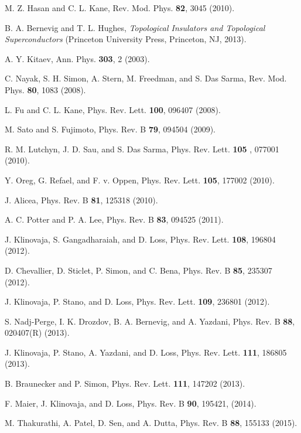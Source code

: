 \documentclass[prl,twocolumn,showpacs,floatfix,amsbsy,amsbsy,superscriptaddress]{revtex4-1}
\begin{document}
\begin{thebibliography}{99}

 M. Z. Hasan and C. L. Kane, Rev. Mod. Phys. {\bf 82}, 3045 (2010).

 B. A. Bernevig and T. L. Hughes, {\it Topological Insulators and Topological Superconductors} (Princeton University Press, Princeton, NJ, 2013).

 A. Y. Kitaev, Ann. Phys. {\bf 303}, 2 (2003).

  C. Nayak, S. H. Simon, A. Stern, M. Freedman, and S. Das Sarma, Rev. Mod. Phys. {\bf 80}, 1083  (2008).

 L. Fu and C. L. Kane, Phys. Rev. Lett. {\bf 100}, 096407 (2008).

 M. Sato and S. Fujimoto, Phys. Rev. B {\bf 79}, 094504 (2009).

 R. M. Lutchyn, J. D. Sau, and S. Das Sarma, Phys. Rev. Lett. {\bf 105} , 077001 (2010).

 Y. Oreg, G. Refael, and F. v. Oppen, Phys. Rev. Lett. {\bf 105}, 177002 (2010).

 J. Alicea, Phys. Rev. B {\bf 81}, 125318 (2010).

 A. C. Potter and P. A. Lee, Phys. Rev. B {\bf 83}, 094525 (2011).

 J. Klinovaja, S. Gangadharaiah, and D. Loss, Phys. Rev. Lett. {\bf 108}, 196804 (2012).

 D. Chevallier, D. Sticlet, P. Simon, and C. Bena, Phys. Rev. B {\bf 85}, 235307 (2012).

 J. Klinovaja, P. Stano, and D. Loss, Phys. Rev. Lett. {\bf 109}, 236801 (2012).

 S. Nadj-Perge, I. K. Drozdov, B. A. Bernevig, and A. Yazdani, Phys. Rev. B {\bf 88}, 020407(R) (2013).

 J. Klinovaja, P. Stano, A. Yazdani, and D. Loss, Phys. Rev. Lett. {\bf 111}, 186805 (2013).

 B. Braunecker and P. Simon, Phys. Rev. Lett. {\bf 111}, 147202 (2013).

 F. Maier, J. Klinovaja, and D. Loss, Phys. Rev. B {\bf 90}, 195421, (2014).

 M. Thakurathi, A. Patel, D. Sen, and A. Dutta, Phys. Rev. B {\bf 88}, 155133 (2015). 


\end{thebibliography}
\end{document}

